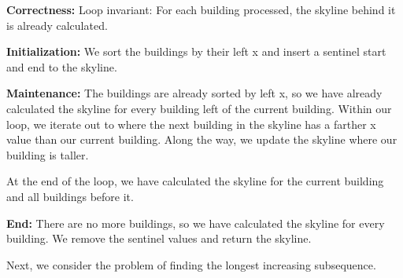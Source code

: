 \documentclass{article}
\begin{document}
{\bf Correctness:} Loop invariant: For each building processed, the skyline behind it is already calculated.

{\bf Initialization:} We sort the buildings by their left x and insert a sentinel start and end to the skyline.

{\bf Maintenance:} The buildings are already sorted by left x, so we have already calculated the skyline for every building left of the current building. Within our loop, we iterate out to where the next building in the skyline has a farther x value than our current building. Along the way, we update the skyline where our building is taller.

At the end of the loop, we have calculated the skyline for the current building and all buildings before it.

{\bf End:} There are no more buildings, so we have calculated the skyline for every building. We remove the sentinel values and return the skyline.

\collab{}

Next, we consider the problem of finding the longest increasing subsequence.
\end{document}
